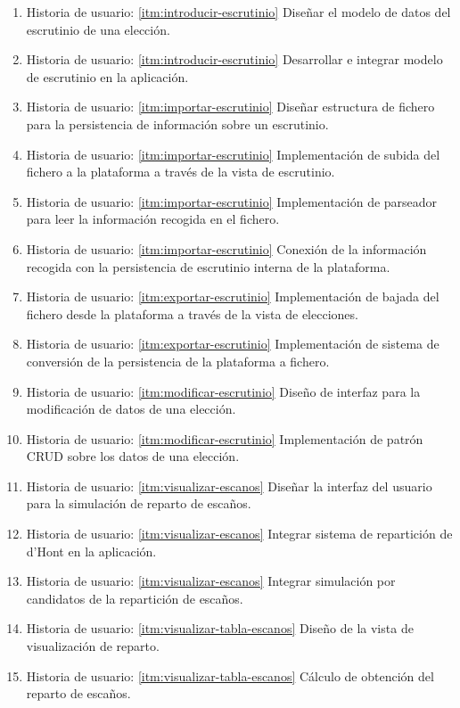 \documentclass{article}
\begin{document}
\begin{enumerate}
        \item Historia de usuario: \ref{itm:introducir-escrutinio} Diseñar el modelo de datos del escrutinio de una elección.
        \item Historia de usuario: \ref{itm:introducir-escrutinio} Desarrollar e integrar modelo de escrutinio en la aplicación.
        \item Historia de usuario: \ref{itm:importar-escrutinio} Diseñar estructura de fichero para la persistencia de información sobre un escrutinio.
        \item Historia de usuario: \ref{itm:importar-escrutinio} Implementación de subida del fichero a la plataforma a través de la vista de escrutinio.
        \item Historia de usuario: \ref{itm:importar-escrutinio} Implementación de parseador para leer la información recogida en el fichero.
        \item Historia de usuario: \ref{itm:importar-escrutinio} Conexión de la información recogida con la persistencia de escrutinio interna de la plataforma.
        \item Historia de usuario: \ref{itm:exportar-escrutinio} Implementación de bajada del fichero desde la plataforma a través de la vista de elecciones.
        \item Historia de usuario: \ref{itm:exportar-escrutinio} Implementación de sistema de conversión de la persistencia de la plataforma a fichero.
        \item Historia de usuario: \ref{itm:modificar-escrutinio} Diseño de interfaz para la modificación de datos de una elección.
        \item Historia de usuario: \ref{itm:modificar-escrutinio} Implementación de patrón CRUD sobre los datos de una elección.
        \item Historia de usuario: \ref{itm:visualizar-escanos} Diseñar la interfaz del usuario para la simulación de reparto de escaños.
        \item Historia de usuario: \ref{itm:visualizar-escanos} Integrar sistema de repartición de d'Hont en la aplicación.
        \item Historia de usuario: \ref{itm:visualizar-escanos} Integrar simulación por candidatos de la repartición de escaños.
        \item Historia de usuario: \ref{itm:visualizar-tabla-escanos} Diseño de la vista de visualización de reparto.
        \item Historia de usuario: \ref{itm:visualizar-tabla-escanos} Cálculo de obtención del reparto de escaños.

\end{enumerate}
\end{document}
